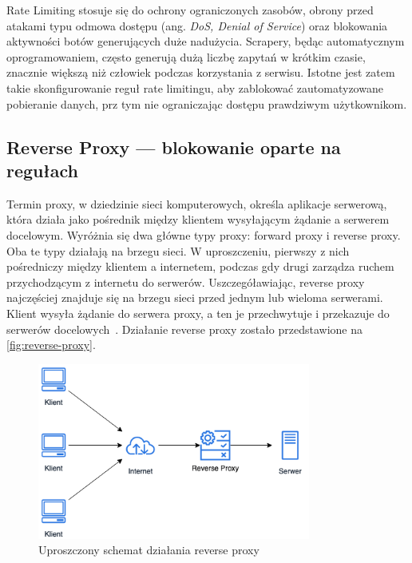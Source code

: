 Rate Limiting stosuje się do ochrony ograniczonych zasobów, obrony przed atakami typu odmowa dostępu (ang. \emph{DoS, Denial of Service})
oraz blokowania aktywności botów generujących duże nadużycia\@.
Scrapery, będąc automatycznym oprogramowaniem, często generują dużą liczbę zapytań w krótkim czasie, znacznie większą niż człowiek podczas korzystania z serwisu.
Istotne jest zatem takie skonfigurowanie reguł rate limitingu, aby zablokować zautomatyzowane pobieranie danych, prz tym nie ograniczając dostępu prawdziwym użytkownikom.

\newpage

\subsection{Reverse Proxy --- blokowanie oparte na regułach}\label{subsec:reverse-proxy}

Termin proxy, w dziedzinie sieci komputerowych, określa aplikacje serwerową, która działa jako pośrednik między klientem wysyłającym żądanie a serwerem docelowym.
Wyróżnia się dwa główne typy proxy: forward proxy i reverse proxy.
Oba te typy działają na brzegu sieci.
W uproszczeniu, pierwszy z nich pośredniczy między klientem a internetem, podczas gdy drugi zarządza ruchem przychodzącym z internetu do serwerów.
Uszczegóławiając, reverse proxy najczęściej znajduje się na brzegu sieci przed jednym lub wieloma serwerami.
Klient wysyła żądanie do serwera proxy, a ten je przechwytuje i przekazuje do serwerów docelowych~\cite{cloudflare-what-is-reverse-proxy}.
Działanie reverse proxy zostało przedstawione na \autoref{fig:reverse-proxy}.

\begin{figure}[H]
    \centering
    \captionsetup{width=.7\linewidth}
    \includegraphics[width=0.8\textwidth]{img/reverse-proxy}
    \caption{Uproszczony schemat działania reverse proxy}
    \label{fig:reverse-proxy}
\end{figure}

